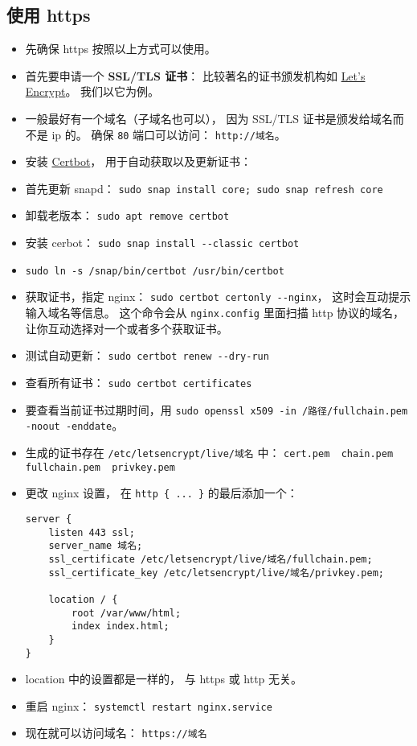 \subsection{使用 https}
\begin{itemize}
\item 先确保 https 按照以上方式可以使用。
\item 首先要申请一个 \textbf{SSL/TLS 证书}： 比较著名的证书颁发机构如 \href{https://letsencrypt.org/}{Let's Encrypt}。 我们以它为例。
\item 一般最好有一个域名（子域名也可以）， 因为 SSL/TLS 证书是颁发给域名而不是 ip 的。 确保 \verb`80` 端口可以访问： \verb`http://域名`。
\item 安装 \href{https://certbot.eff.org/instructions?ws=nginx&os=ubuntufocal}{Certbot}， 用于自动获取以及更新证书：
\item 首先更新 snapd： \verb`sudo snap install core; sudo snap refresh core`
\item 卸载老版本： \verb`sudo apt remove certbot`
\item 安装 cerbot： \verb`sudo snap install --classic certbot`
\item \verb`sudo ln -s /snap/bin/certbot /usr/bin/certbot`
\item 获取证书，指定 nginx： \verb`sudo certbot certonly --nginx`， 这时会互动提示输入域名等信息。 这个命令会从 \verb`nginx.config` 里面扫描 http 协议的域名， 让你互动选择对一个或者多个获取证书。
\item 测试自动更新： \verb`sudo certbot renew --dry-run`
\item 查看所有证书： \verb`sudo certbot certificates`
\item 要查看当前证书过期时间，用 \verb`sudo openssl x509 -in /路径/fullchain.pem -noout -enddate`。
\item 生成的证书存在 \verb`/etc/letsencrypt/live/域名` 中： \verb`cert.pem  chain.pem  fullchain.pem  privkey.pem`
\item 更改 nginx 设置， 在 \verb`http { ... }` 的最后添加一个：
\begin{lstlisting}[language=none]
server {
    listen 443 ssl;
    server_name 域名;
    ssl_certificate /etc/letsencrypt/live/域名/fullchain.pem;
    ssl_certificate_key /etc/letsencrypt/live/域名/privkey.pem;

    location / {
        root /var/www/html;
        index index.html;
    }
}
\end{lstlisting}
\item location 中的设置都是一样的， 与 https 或 http 无关。
\item 重启 nginx： \verb`systemctl restart nginx.service`
\item 现在就可以访问域名： \verb`https://域名`
\end{itemize}

